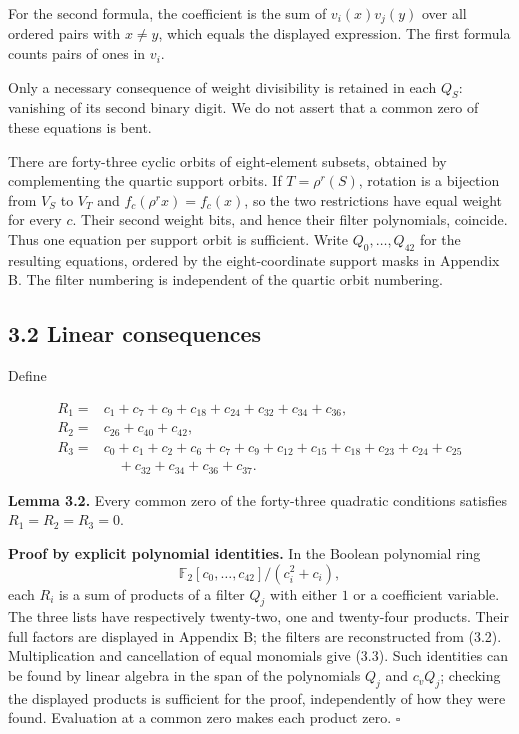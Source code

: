 \documentclass[pdflatex,sn-mathphys-num]{sn-jnl}
\begin{document}
For the second formula, the coefficient is the sum of $v_i(x)v_j(y)$ over all ordered pairs with $x\ne y$, which equals the displayed expression. The first formula counts pairs of ones in $v_i$.

Only a necessary consequence of weight divisibility is retained in each $Q_S$: vanishing of its second binary digit. We do not assert that a common zero of these equations is bent.

There are forty-three cyclic orbits of eight-element subsets, obtained by complementing the quartic support orbits. If $T=\rho^r(S)$, rotation is a bijection from $V_S$ to $V_T$ and $f_c(\rho^r x)=f_c(x)$, so the two restrictions have equal weight for every $c$. Their second weight bits, and hence their filter polynomials, coincide. Thus one equation per support orbit is sufficient. Write $Q_0,\ldots,Q_{42}$ for the resulting equations, ordered by the eight-coordinate support masks in Appendix B. The filter numbering is independent of the quartic orbit numbering.

\subsection*{3.2 Linear consequences}

Define

\[
\begin{aligned}
R_1={}&c_1+c_7+c_9+c_{18}+c_{24}+c_{32}+c_{34}+c_{36},\\
R_2={}&c_{26}+c_{40}+c_{42},\\
R_3={}&c_0+c_1+c_2+c_6+c_7+c_9+c_{12}+c_{15}+c_{18}
       +c_{23}+c_{24}+c_{25}\\&\quad+c_{32}+c_{34}+c_{36}+c_{37}.
\end{aligned} \tag{3.3}
\]

\textbf{Lemma 3.2.} Every common zero of the forty-three quadratic conditions satisfies $R_1=R_2=R_3=0$.

\textbf{Proof by explicit polynomial identities.} In the Boolean polynomial ring
\[\mathbb F_2[c_0,\ldots,c_{42}]/(c_i^2+c_i),\]
each $R_i$ is a sum of products of a filter $Q_j$ with either $1$ or a coefficient variable. The three lists have respectively twenty-two, one and twenty-four products. Their full factors are displayed in Appendix B; the filters are reconstructed from (3.2). Multiplication and cancellation of equal monomials give (3.3). Such identities can be found by linear algebra in the span of the polynomials $Q_j$ and $c_vQ_j$; checking the displayed products is sufficient for the proof, independently of how they were found. Evaluation at a common zero makes each product zero. \hfill$\square$
\end{document}
